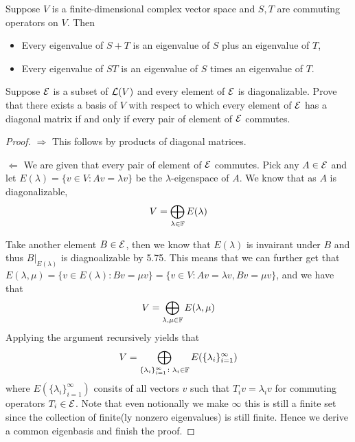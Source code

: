 \documentclass{extarticle}
\begin{document}
\begin{thm}
    Suppose \(V\) is a finite-dimensional complex vector space and \(S, T\) are commuting operators 
    on \(V\). Then 
    \begin{itemize}
        \item Every eigenvalue of \(S + T\) is an eigenvalue of \(S\) plus an eigenvalue of \(T\), 
        \item Every eigenvalue of \(ST\) is an eigenvalue of \(S\) times an eigenvalue of \(T\).
    \end{itemize}
\end{thm}






\newpage 
{}


\begin{problem}{2}
    Suppose \(\mathcal{E}\) is a subset of \(\mathcal{L}(V)\) and every element of \(\mathcal{E}\) is diagonalizable. Prove that 
    there exists a basis of \(V\) with respect to which every element of \(\mathcal{E}\) has a diagonal matrix 
    if and only if every pair of element of \(\mathcal{E}\) commutes.
\end{problem}

\begin{proof}
\(\Rightarrow\) This follows by products of diagonal matrices.

\(\Leftarrow\) We are given that every pair of element of \(\mathcal{E}\) commutes. Pick any \(A \in \mathcal{E}\) and 
let \(E(\lambda) = \{v \in V \colon Av = \lambda v\}\) be the \(\lambda\)-eigenspace of \(A\). We know 
that as \(A\) is diagonalizable, 
\[V = \bigoplus_{\lambda \in \mathbb{F}} E(\lambda)\] 

Take another element \(B \in \mathcal{E}\), then we know that \(E(\lambda)\) is invairant under \(B\) and thus 
\(B|_{E(\lambda)}\) is diagnoalizable by 5.75. This means that we can further get that \(E(\lambda, \mu) 
= \{v \in E(\lambda) \colon Bv = \mu v\} = \{v \in V \colon Av=\lambda v, Bv = \mu v\}\), and we have that 
\[V = \bigoplus_{\lambda, \mu \in \mathbb{F}} E(\lambda, \mu)\]
Applying the argument recursively yields that 
\[V = \bigoplus_{\{\lambda_i\}_{i=1}^\infty \colon \lambda_i \in \mathbb{F}} E(\{\lambda_i\}_{i=1}^\infty) \]
where \(E(\{\lambda_i\}_{i=1}^\infty)\) consits of all vectors \(v\) such that 
\(T_i v = \lambda_i v\) for commuting operators \(T_i \in \mathcal{E}\). Note that even notionally we make 
\(\infty\) this is still a finite set since the collection of finite(ly nonzero eigenvalues) is still 
finite. Hence we derive a common eigenbasis and finish the proof.
\end{proof}
\end{document}

